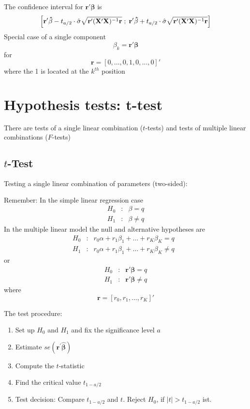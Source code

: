 \documentclass{article}
\begin{document}
The confidence interval for $\mathbf{r}'\mathbf{\beta }$ is
\[ \left[ \mathbf{r}'\mathbf{\hat{\beta}}-t_{a/2}\cdot \hat{\sigma}%
\sqrt{\mathbf{r}'(\mathbf{X}'\mathbf{X})^{-1}\mathbf{r}}%
\;;\;\mathbf{r}'\mathbf{\hat{\beta}}+t_{a/2}\cdot \hat{\sigma}\sqrt{%
\mathbf{r}'(\mathbf{X}'\mathbf{X})^{-1}\mathbf{r}}\right] \]
Special case of a single component
\[ \beta _{k}=\mathbf{r}'\mathbf{\beta } \]
for
\[ \mathbf{r}=[0,\ldots ,0,1,0,\ldots ,0]' \]
where the 1 is located at the $k^{th}$ position

\section{Hypothesis tests: t-test}

There are tests of a single linear combination ($t$-tests) and tests
of multiple linear combinations ($F$-tests)

\subsection*{$t$-Test}

Testing a single linear combination of parameters (two-sided):

 Remember: In the simple linear regression case
\begin{eqnarray*}
H_{0} &:&\beta =q \\
H_{1} &:&\beta \neq q
\end{eqnarray*}
In the multiple linear model the null and alternative hypotheses are
\begin{eqnarray*}
H_{0} &:&r_{0}\alpha +r_{1}\beta _{1}+\ldots +r_{K}\beta _{K}=q\text{ } \\
H_{1} &:&r_{0}\alpha +r_{1}\beta _{1}+\ldots +r_{K}\beta _{K}\neq q
\end{eqnarray*}
or
\begin{eqnarray*}
H_{0} &:&\mathbf{r}'\mathbf{\beta }=q \\
H_{1} &:&\mathbf{r}'\mathbf{\beta }\neq q
\end{eqnarray*}
where
\begin{equation*}
\mathbf{r}=[r_{0},r_{1},\ldots ,r_{K}]'
\end{equation*}

The test procedure:
\begin{enumerate}
\item Set up $H_{0}$ and $H_{1}$ and fix the significance level $a$
\item Estimate $se\mathbf{(\mathbf{r}^{\prime }\mathbf{\hat{\beta}})}$
\item Compute the $t$-statistic
\item Find the critical value $t_{1-a/2}$
\item Test decision: Compare $t_{1-a/2}$ and $t$. Reject $H_0$,
if $|t|>t_{1-a/2}$ ist.
\end{enumerate}
\end{document}
